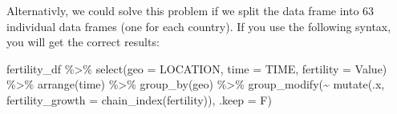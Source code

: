 \documentclass[
]{article}
\newenvironment{Shaded}{\begin{snugshade}}{\end{snugshade}}
\newcommand{\AttributeTok}[1]{\textcolor[rgb]{0.77,0.63,0.00}{#1}}
\newcommand{\FunctionTok}[1]{\textcolor[rgb]{0.00,0.00,0.00}{#1}}
\newcommand{\NormalTok}[1]{#1}
\newcommand{\SpecialCharTok}[1]{\textcolor[rgb]{0.00,0.00,0.00}{#1}}
\begin{document}
Alternativly, we could solve this problem if we split the data frame into 63 individual data frames (one for each country). If you use the following syntax, you will get the correct results:

\begin{Shaded}
\begin{Highlighting}[]
\NormalTok{fertility\_df }\SpecialCharTok{\%\textgreater{}\%} 
  \FunctionTok{select}\NormalTok{(}\AttributeTok{geo =}\NormalTok{ LOCATION, }\AttributeTok{time =}\NormalTok{ TIME, }\AttributeTok{fertility =}\NormalTok{ Value) }\SpecialCharTok{\%\textgreater{}\%} 
  \FunctionTok{arrange}\NormalTok{(time) }\SpecialCharTok{\%\textgreater{}\%} 
  \FunctionTok{group\_by}\NormalTok{(geo) }\SpecialCharTok{\%\textgreater{}\%} 
  \FunctionTok{group\_modify}\NormalTok{(}\SpecialCharTok{\textasciitilde{}} \FunctionTok{mutate}\NormalTok{(.x, }\AttributeTok{fertility\_growth =} \FunctionTok{chain\_index}\NormalTok{(fertility)), }\AttributeTok{.keep =}\NormalTok{ F)}
\end{Highlighting}
\end{Shaded}
\end{document}
